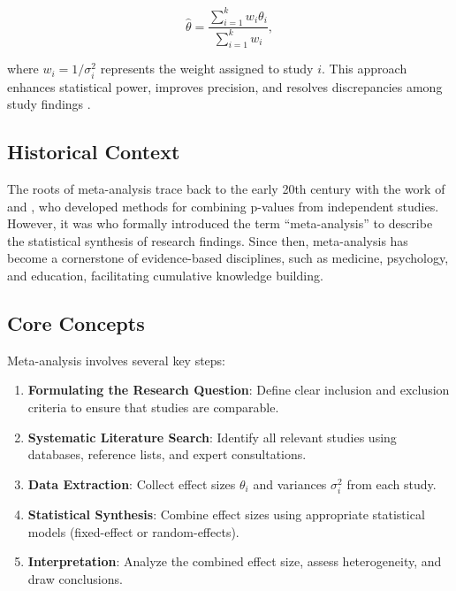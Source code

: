 \documentclass[12pt,a4paper]{report}
\begin{document}
\begin{equation}
\label{eq:meta_estimator}
\hat{\theta} = \frac{\sum_{i=1}^k w_i \theta_i}{\sum_{i=1}^k w_i},
\end{equation}

where $w_i = 1/\sigma_i^2$ represents the weight assigned to study $i$. This approach enhances statistical power, improves precision, and resolves discrepancies among study findings \citep{borenstein2021}.

\subsection{Historical Context}
\label{subsec:historical_context}

The roots of meta-analysis trace back to the early 20th century with the work of \citet{pearson1904} and \citet{fisher1932}, who developed methods for combining p-values from independent studies. However, it was \citet{glass1976primary} who formally introduced the term ``meta-analysis'' to describe the statistical synthesis of research findings. Since then, meta-analysis has become a cornerstone of evidence-based disciplines, such as medicine, psychology, and education, facilitating cumulative knowledge building.

\subsection{Core Concepts}
\label{subsec:core_concepts}

Meta-analysis involves several key steps:

\begin{enumerate}[label=\arabic*.]
    \item \textbf{Formulating the Research Question}: Define clear inclusion and exclusion criteria to ensure that studies are comparable.
    \item \textbf{Systematic Literature Search}: Identify all relevant studies using databases, reference lists, and expert consultations.
    \item \textbf{Data Extraction}: Collect effect sizes $\theta_i$ and variances $\sigma_i^2$ from each study.
    \item \textbf{Statistical Synthesis}: Combine effect sizes using appropriate statistical models (fixed-effect or random-effects).
    \item \textbf{Interpretation}: Analyze the combined effect size, assess heterogeneity, and draw conclusions.
\end{enumerate}
\end{document}
